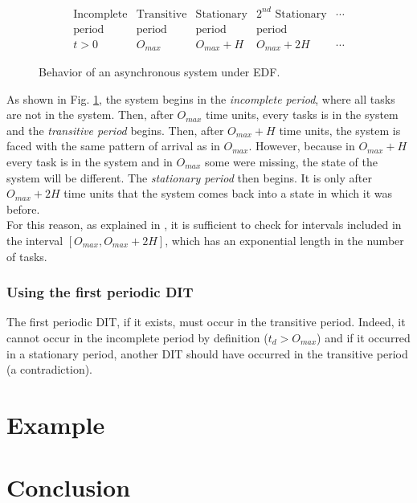 \documentclass[times, 10pt,twocolumn, a4paper]{article}
\begin{document}
\begin{figure}[h]
$$
\begin{array}{|c|c|c|c|l}
   \text{Incomplete} & \text{Transitive} & \text{Stationary} & \text{$2^{nd}$ Stationary} & \cdots \\
   \text{period} & \text{period} & \text{period} & \text{period} & \\
  \hline
  t > 0 & O_{max} & O_{max} + H & O_{max} + 2H & \cdots
\end{array}
$$
\begin{center}
\caption{Behavior of an asynchronous system under EDF.}
\label{fig:asyncBehavior}
\end{center}
\end{figure}

As shown in Fig. \ref{fig:asyncBehavior}, the system begins in the \emph{incomplete period}, where all tasks are not in the system. Then, after $O_{max}$ time units, every tasks is in the system and the \emph{transitive period} begins. Then, after $O_{max} + H$ time units, the system is faced with the same pattern of arrival as in $O_{max}$. However, because in $O_{max} + H$ every task is in the system and in $O_{max}$ some were missing, the state of the system will be different. The \emph{stationary period} then begins. It is only after $O_{max} + 2H$ time units that the system comes back into a state in which it was before.\\

For this reason, as explained in \cite{leung1982complexity}, it is sufficient to check for intervals included in the interval $[O_{max}, O_{max} + 2H]$, which has an exponential length in the number of tasks.

\subsubsection{Using the first periodic DIT}

The first periodic DIT, if it exists, must occur in the transitive period. Indeed, it cannot occur in the incomplete period by definition ($t_d > O_{max}$) and if it occurred in a stationary period, another DIT should have occurred in the transitive period (a contradiction).\\



\section{Example}

\section{Conclusion}



\end{document}

